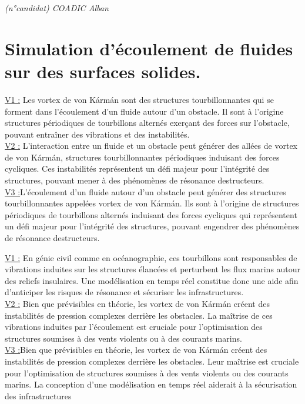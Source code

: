 \documentclass{article}
\begin{document}
\textit{(n°candidat) COADIC Alban}

\section*{Simulation d'écoulement de fluides sur des surfaces solides.}
\vspace{5mm}


\underline{\color{green!70!black}V1 :} Les vortex de von Kármán sont des structures tourbillonnantes qui se forment dans l'écoulement 
d'un fluide autour d'un obstacle. Il sont à l'origine structures périodiques de tourbillons
alternés exerçant des forces sur l'obstacle, pouvant entraîner des vibrations et des
instabilités.\\

\underline{\color{green!70!black}V2 :} L'interaction entre un fluide et un obstacle peut générer des allées de vortex de von Kármán, 
structures tourbillonnantes périodiques induisant des forces cycliques. Ces instabilités 
représentent un défi majeur pour l'intégrité des structures, pouvant mener à des phénomènes 
de résonance destructeurs.\\

\underline{\color{green!70!black}V3 :}L'écoulement d'un fluide autour d'un obstacle peut générer des structures
tourbillonnantes appelées vortex de von Kármán. Ils sont à l'origine de structures
périodiques de tourbillons alternés induisant des forces cycliques qui représentent un
défi majeur pour l'intégrité des structures, pouvant engendrer des phénomènes de
résonance destructeurs.

\vspace{8mm}

\underline{\color{blue}V1 :} En génie civil comme en océanographie, ces tourbillons sont responsables 
de vibrations induites sur les structures élancées et perturbent les flux marins autour des 
reliefs insulaires. Une modélisation en temps réel constitue donc une aide afin  
d'anticiper les risques de résonance et sécuriser les infrastructures.\\

\underline{\color{blue}V2 :} Bien que prévisibles en théorie, les vortex de von Kármán créent des 
instabilités de pression complexes derrière les obstacles. La maîtrise de ces vibrations 
induites par l'écoulement est cruciale pour l'optimisation des structures soumises à des 
vents violents ou à des courants marins.\\

\underline{\color{blue}V3 :}Bien que prévisibles en théorie, les vortex de von Kármán créent des instabilités de
pression complexes derrière les obstacles. Leur maîtrise est cruciale pour l'optimisation
de structures soumises à des vents violents ou des courants marins. La conception d'une
modélisation en temps réel aiderait à la sécurisation des infrastructures
\end{document}
